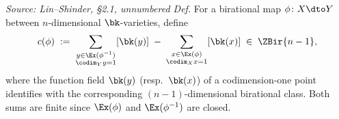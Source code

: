 \begin{definition}
  \label{def:c-invariant}
  \textit{Source: Lin--Shinder, §2.1, unnumbered Def.}
  For a birational map \(\phi \colon X \dto Y\) between \(n\)-dimensional
  \(\bk\)-varieties, define
  \[
    c(\phi) \;:=\;
    \sum_{\substack{y \in \Ex(\phi^{-1}) \\ \codim_Y y = 1}} [\bk(y)]
    \;-\;
    \sum_{\substack{x \in \Ex(\phi) \\ \codim_X x = 1}} [\bk(x)]
    \;\in\; \ZBir{n-1},
  \]
  where the function field \(\bk(y)\) (resp.\ \(\bk(x)\)) of a codimension-one
  point identifies with the corresponding \((n{-}1)\)-dimensional birational class.
  Both sums are finite since \(\Ex(\phi)\) and \(\Ex(\phi^{-1})\) are closed.
\end{definition}

